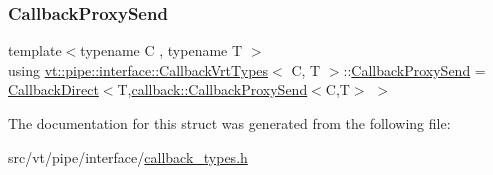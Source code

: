 \mbox{\label{structvt_1_1pipe_1_1interface_1_1_callback_vrt_types_abde4eb815f6fb701e5ffe86350cb67ee}} 
\subsubsection{\texorpdfstring{Callback\+Proxy\+Send}{CallbackProxySend}}
{\footnotesize\ttfamily template$<$typename C , typename T $>$ \\
using \hyperlink{structvt_1_1pipe_1_1interface_1_1_callback_vrt_types}{vt\+::pipe\+::interface\+::\+Callback\+Vrt\+Types}$<$ C, T $>$\+::\hyperlink{structvt_1_1pipe_1_1interface_1_1_callback_vrt_types_abde4eb815f6fb701e5ffe86350cb67ee}{Callback\+Proxy\+Send} =  \hyperlink{structvt_1_1pipe_1_1interface_1_1_callback_direct}{Callback\+Direct}$<$T,\hyperlink{structvt_1_1pipe_1_1callback_1_1_callback_proxy_send}{callback\+::\+Callback\+Proxy\+Send}$<$C,T$>$ $>$}



The documentation for this struct was generated from the following file\+:\begin{DoxyCompactItemize}
\item 
src/vt/pipe/interface/\hyperlink{callback__types_8h}{callback\+\_\+types.\+h}\end{DoxyCompactItemize}
